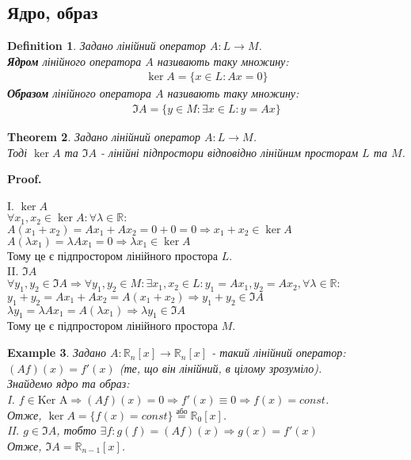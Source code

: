 \documentclass[a4paper, 10pt]{article}
\makeatletter
\theoremstyle{theoremdd}
\newtheorem{theorem}{Theorem}[subsection]
\newtheorem{definition}[theorem]{Definition}
\newtheorem{example}[theorem]{Example}
\renewenvironment{proof}[1][Proof.\\]{\par
\pushQED{\hfill \qed}%
\normalfont \topsep6\p@\@plus6\p@\relax
\trivlist
\item\relax
{\bfseries
#1\@addpunct{.}}\hspace\labelsep\ignorespaces
}{%
\popQED\endtrivlist\@endpefalse
}
\makeatother
\begin{document}
	\subsection{Ядро, образ}
	\begin{definition}
	Задано лінійний оператор $A: L \to M$.\\
	\textbf{Ядром} лінійного оператора $A$ називають таку множину:
	\begin{align*}
	\ker A = \{x \in L: Ax = 0\}
	\end{align*}
	\textbf{Образом} лінійного оператора $A$ називають таку множину:
	\begin{align*}
	\Im A = \{y \in M: \exists x \in L: y = Ax\}
	\end{align*}
	\end{definition}
	
	\begin{theorem}
	Задано лінійний оператор $A: L \to M$.\\
	Тоді $\ker A$ та $\Im A$ - лінійні підпростори відповідно лінійним просторам $L$ та $M$.
	\end{theorem}
	
	\begin{proof}
	I. $\ker A$\\
	$\forall x_1, x_2 \in \ker A: \forall \lambda \in \mathbb{R}:$\\
	$A(x_1+x_2)=Ax_1+Ax_2 = 0 + 0 = 0 \Rightarrow x_1+x_2 \in \ker A$\\
	$A(\lambda x_1) = \lambda Ax_1 = 0 \Rightarrow \lambda x_1 \in \ker A$\\
	Тому це є підпростором лінійного простора $L$.
	\bigskip \\
	II. $\Im A$\\
	$\forall y_1, y_2 \in \Im A \Rightarrow \forall y_1, y_2 \in M: \exists x_1, x_2 \in L: y_1 = Ax_1, y_2 = Ax_2, \forall \lambda \in \mathbb{R}:$\\
	$y_1 + y_2 = Ax_1 + Ax_2 = A(x_1+x_2) \Rightarrow y_1+y_2 \in \Im A$\\
	$\lambda y_1 = \lambda Ax_1 = A(\lambda x_1) \Rightarrow \lambda y_1 \in \Im A$\\
	Тому це є підпростором лінійного простора $M$.
	\end{proof}
	
	\begin{example}
	Задано $A: \mathbb{R}_n[x] \to \mathbb{R}_n[x]$ - такий лінійний оператор:\\
	$(Af)(x) = f'(x)$ (те, що він лінійний, в цілому зрозуміло).\\
	Знайдемо ядро та образ:\\
	I. $f \in \textrm{Ker A} \Rightarrow (Af)(x) = 0 \Rightarrow f'(x) \equiv 0 \Rightarrow f(x) = const$.\\
	Отже, $\ker A = \{ f(x) = const\} \overset{\textrm{або}}{=} \mathbb{R}_0[x]$.\\
	II. $g \in \Im A$, тобто $\exists f: g(f) = (Af)(x) \Rightarrow g(x) = f'(x)$\\
	Отже, $\Im A = \mathbb{R}_{n-1}[x]$.
	\end{example}
\end{document}
